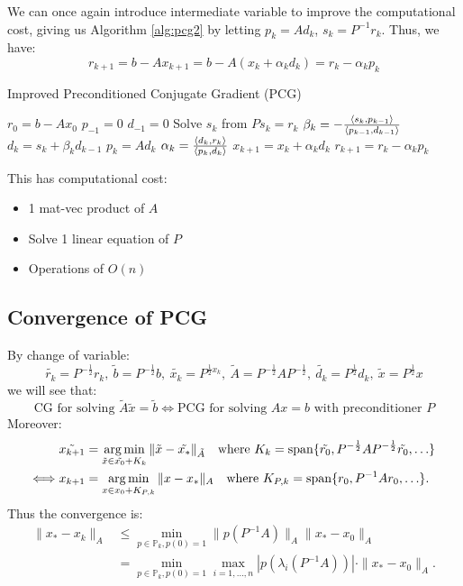 \documentclass[../main/main.tex]{subfiles}
\begin{document}
We can once again introduce intermediate variable to improve the computational cost, giving us Algorithm \ref{alg:pcg2} by letting $p_{k}=Ad_{k}$, $s_{k} = P^{-1}r_{k}$. Thus, we have: \[
  r_{k+1} = b-Ax_{k+1} = b-A(x_{k}+\alpha_{k}d_{k}) = r_{k}-\alpha_{k} p_{k}
\]
\begin{algorithm}[h!]
  \caption{Improved Preconditioned Conjugate Gradient (PCG)}\label{alg:pcg2}
  \begin{algorithmic}[1]
    \State $r_{0}= b-Ax_{0}$
    \State $p_{-1}=0$
    \State $d_{-1}=0$
   \State Solve $s_{k}$ from $Ps_{k}=r_{k}$
   \State $\beta_{k}= - \frac{\left\langle{s_{k}},{p_{k-1}}\right\rangle}{\left\langle{p_{k-1}},{d_{k-1}}\right\rangle} $
   \State $d_{k}=s_{k}+\beta_{k}d_{k-1}$
   \State $p_{k}=Ad_{k}$
   \State $\alpha_{k}= \frac{\left\langle{d_{k}},{r_{k}}\right\rangle}{\left\langle{p_{k}},{d_{k}}\right\rangle} $
   \State $x_{k+1}=x_{k}+\alpha_{k}d_{k}$
   \State $r_{k+1}=r_{k}-\alpha_{k}p_{k}$
   \EndFor
  \end{algorithmic}
\end{algorithm}
This has computational cost:
\begin{itemize}
\item 1 mat-vec product of $A$
        \item Solve 1 linear equation of $P$
        \item Operations of $O(n)$
\end{itemize}


\subsection{Convergence of PCG}
By change of variable: \[
  \tilde{r_{k}} = P^{-\frac{1}{2}}r_{k},\ \tilde{b} = P^{-\frac{1}{2}}b,\ \tilde{x_{k}}= P^{\frac{1}{2}x_{k}},\ \tilde{A} = P^{-\frac{1}{2}}AP^{-\frac{1}{2}},\ \tilde{d_{k}} = P^{\frac{1}{2}}d_{k},\ \tilde{x}= P^{\frac{1}{2}}x
\]
we will see that: \[
\text{CG for solving }\tilde{A}\tilde{x}=\tilde{b}\iff\text{PCG for solving }Ax=b \text{ with preconditioner }P
\]
Moreover:
\begin{align*}
&\tilde{x_{k+1}} = \operatorname*{arg\,min}_{\tilde{x}\in\tilde{x_{0}}+K_{k}} \|\tilde{x}-\tilde{x_{*}}\|_{\tilde{A}} \quad\text{where $K_{k} = \operatorname{span} \{\tilde{r_{0}},P^{-\frac{1}{2}}A P^{-\frac{1}{2}}\tilde{r_{0}}, \ldots\}$  }\\
  \iff &x_{k+1} = \operatorname*{arg\,min}_{x \in x_{0}+K_{P,k}} \|x-x_{*}\|_{A} \quad\text{where $K_{P,k}= \operatorname{span} \{ r_{0}, P^{-1} A r_{0}, \ldots\}$}
  .\end{align*}
Thus the convergence is: \begin{align*}
                           \|x_{*}-x_{k}\|_{A} &\leq\min_{p \in\mathbb{P}_{k}, p(0)=1} \|p(P^{-1}A)\|_{A} \|x_{*}-x_{0}\|_{A}\\
                           &= \min_{p\in\mathbb{P}_{k}, p(0)=1} \max_{i = 1 , \ldots , n}|p(\lambda_{i}(P^{-1}A))| \cdot \|x_{*}-x_{0}\|_{A}
                           .\end{align*}
\end{document}
